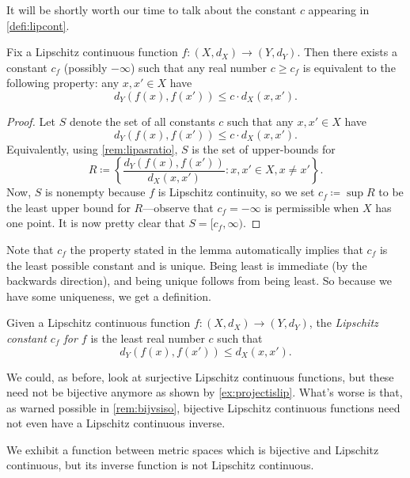 \documentclass[../notes.tex]{subfiles}
\begin{document}
It will be shortly worth our time to talk about the constant $c$ appearing in \autoref{defi:lipcont}.
\begin{lemma} \label{lem:getlipconst}
	Fix a Lipschitz continuous function $f\colon(X,d_X)\to(Y,d_Y)$. Then there exists a constant $c_f$ (possibly $-\infty$) such that any real number $c\ge c_f$ is equivalent to the following property: any $x,x'\in X$ have
	\[d_Y(f(x),f(x'))\le c\cdot d_X(x,x').\]
\end{lemma}
\begin{proof}
	Let $S$ denote the set of all constants $c$ such that any $x,x'\in X$ have
	\[d_Y(f(x),f(x'))\le c\cdot d_X(x,x').\]
	Equivalently, using \autoref{rem:lipasratio}, $S$ is the set of upper-bounds for
	\[R\coloneqq\left\{\frac{d_Y(f(x),f(x'))}{d_X(x,x')}:x,x'\in X,x\ne x'\right\}.\]
	Now, $S$ is nonempty because $f$ is Lipschitz continuity, so we set $c_f\coloneqq\sup R$ to be the least upper bound for $R$---observe that $c_f=-\infty$ is permissible when $X$ has one point. It is now pretty clear that $S=[c_f,\infty)$.
\end{proof}
Note that $c_f$ the property stated in the lemma automatically implies that $c_f$ is the least possible constant and is unique. Being least is immediate (by the backwards direction), and being unique follows from being least. So because we have some uniqueness, we get a definition.
\begin{definition}
	Given a Lipschitz continuous function $f\colon(X,d_X)\to(Y,d_Y)$, the \textit{Lipschitz constant $c_f$ for $f$} is the least real number $c$ such that
	\[d_Y(f(x),f(x'))\le d_X(x,x').\]
\end{definition}
We could, as before, look at surjective Lipschitz continuous functions, but these need not be bijective anymore as shown by \autoref{ex:projectislip}. What's worse is that, as warned possible in \autoref{rem:bijvsiso}, bijective Lipschitz continuous functions need not even have a Lipschitz continuous inverse.
\begin{exe} \label{exe:sadbijlip}
	We exhibit a function between metric spaces which is bijective and Lipschitz continuous, but its inverse function is not Lipschitz continuous.
\end{exe}
\end{document}
